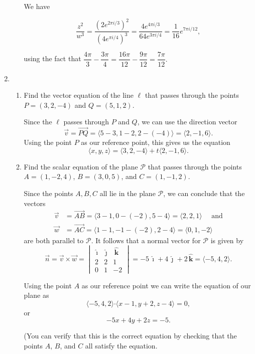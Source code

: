 \documentclass[12pt]{article}
\newcommand{\points}[1]{\marginpar{\hspace{24pt}[#1]}}
\newcommand{\dotp}{\boldsymbol{\cdot}}
\newcommand{\ivec}{\,\boldsymbol{\hat{\imath}}}
\newcommand{\jvec}{\,\boldsymbol{\hat{\jmath}}}
\newcommand{\kvec}{\,\boldsymbol{\hat{k}}}
\newcommand{\bvm}{\begin{vmatrix}}
\newcommand{\evm}{\end{vmatrix}}
\begin{document}
\begin{enumerate}
\begin{enumerate}
\bigskip

We have

\[
 \frac{z^2}{w^3} = \frac{(2e^{2\pi i/3})^2}{(4e^{\pi i/4})^3} = \frac{4e^{4\pi i/3}}{64e^{3\pi i/4}} = \frac{1}{16}e^{7\pi i/12},
\]

using the fact that $\dfrac{4\pi}{3} -\dfrac{3\pi}{4} = \dfrac{16\pi}{12} - \dfrac{9\pi}{12} = \dfrac{7\pi}{12}.$
\end{enumerate}
\newpage

\item \begin{enumerate}
\item Find the vector equation of the line $\ell$ that passes through the points $P=(3,2,-4)$ and $Q=(5,1,2)$. \points{3}

\bigskip

Since the $\ell$ passes through $P$ and $Q$, we can use the direction vector
\[
 \vec{v} = \overrightarrow{PQ} =\langle 5-3, 1-2, 2-(-4)\rangle = \langle 2, -1, 6\rangle.
\]
Using the point $P$ as our reference point, this gives us the equation
\[
 \langle x,y,z\rangle = \langle 3,2,-4\rangle + t\langle 2,-1,6\rangle.
\]

\bigskip


\item Find the scalar equation of the plane $\mathcal{P}$ that passes through the points $A=(1,-2,4)$, $B=(3,0,5)$, and $C = (1,-1,2)$. \points{5}

\bigskip

Since the points $A, B, C$ all lie in the plane $\mathcal{P}$, we can conclude that the vectors
\begin{align*}
 \vec{v} & = \overrightarrow{AB} = \langle 3-1,0-(-2),5-4\rangle = \langle 2, 2, 1\rangle \quad \text{ and}\\
 \vec{w} & = \overrightarrow{AC} = \langle 1-1, -1-(-2), 2-4\rangle = \langle 0, 1, -2\rangle
\end{align*}
are both parallel to $\mathcal{P}$. It follows that a normal vector for $\mathcal{P}$ is given by
\[
 \vec{n} = \vec{v}\times \vec{w} = \bvm \ivec & \jvec & \kvec\\ 2&2&1\\0&1&-2\evm = -5\ivec +4\jvec+2\kvec = \langle -5, 4, 2\rangle.
\]

Using the point $A$ as our reference point we can write the equation of our plane as
\[
 \langle -5, 4, 2\rangle \dotp \langle x-1, y+2, z-4\rangle = 0,
\]
or
\[
 -5x+4y+2z = -5.
\]

(You can verify that this is the correct equation by checking that the points $A$, $B$, and $C$ all satisfy the equation.


\end{enumerate}
\end{enumerate}
\end{document}
